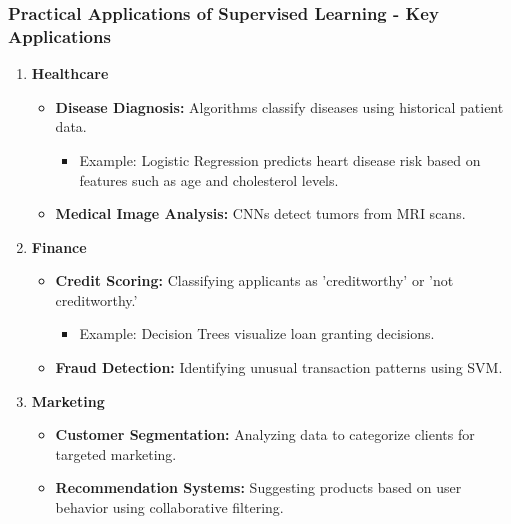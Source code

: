 \documentclass[aspectratio=169]{beamer}
\begin{document}
\begin{frame}[fragile]
    \frametitle{Practical Applications of Supervised Learning - Key Applications}
    \begin{enumerate}
        \item \textbf{Healthcare}
        \begin{itemize}
            \item \textbf{Disease Diagnosis:} Algorithms classify diseases using historical patient data.
                \begin{itemize}
                    \item Example: Logistic Regression predicts heart disease risk based on features such as age and cholesterol levels.
                \end{itemize}
            \item \textbf{Medical Image Analysis:} CNNs detect tumors from MRI scans.
        \end{itemize}
        
        \item \textbf{Finance}
        \begin{itemize}
            \item \textbf{Credit Scoring:} Classifying applicants as 'creditworthy' or 'not creditworthy.'
                \begin{itemize}
                    \item Example: Decision Trees visualize loan granting decisions.
                \end{itemize}
            \item \textbf{Fraud Detection:} Identifying unusual transaction patterns using SVM.
        \end{itemize}
        
        \item \textbf{Marketing}
        \begin{itemize}
            \item \textbf{Customer Segmentation:} Analyzing data to categorize clients for targeted marketing.
            \item \textbf{Recommendation Systems:} Suggesting products based on user behavior using collaborative filtering.
        \end{itemize}
    \end{enumerate}
\end{frame}
\end{document}

